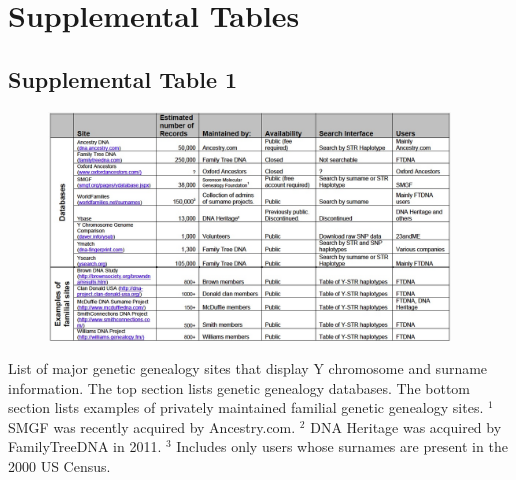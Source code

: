 \pagebreak
\section{Supplemental Tables}
\subsection{Supplemental Table 1}
\begin{figure}[h!]
\centering
\label{tab:sursuptab1} %
\includegraphics[width=0.95\textwidth]{Figures/App1/SuppTab1.jpg}
\end{figure}
List of major genetic genealogy sites that display Y chromosome and surname information. The top section lists genetic genealogy databases. The bottom section lists examples of privately maintained familial genetic genealogy sites.
$^1$ SMGF was recently acquired by Ancestry.com. $^2$ DNA Heritage was acquired by FamilyTreeDNA in 2011. $^3$ Includes only users whose surnames are present in the 2000 US Census.

\pagebreak
